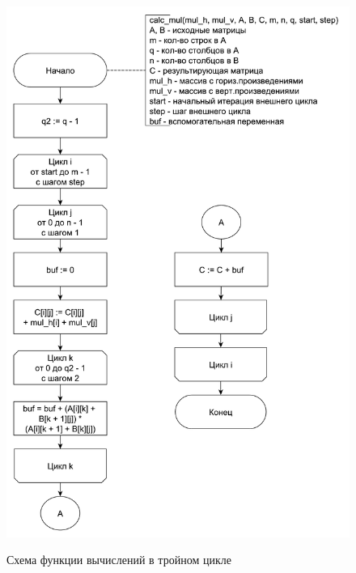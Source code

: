 \documentclass[a4paper,14pt]{article}
\begin{document}
	    	    \begin{figure}[h!]
	    	\begin{center}
	    		{\includegraphics[scale = 0.5]{schema04.pdf}}
	    		\caption{Схема функции вычислений в тройном цикле}
	    		\label{fig:schema_m}
	    	\end{center}
	    \end{figure}
	    
\end{document}
